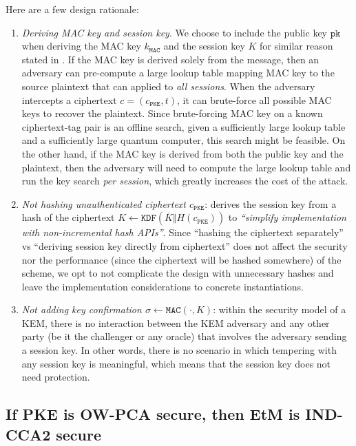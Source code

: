 \documentclass[floatrow,journal=tches,submission]{iacrtrans}
\newcommand{\monospace}{\texttt}
\newcommand{\pke}{\monospace{PKE}}
\newcommand{\mac}{\monospace{MAC}}
\newcommand{\pk}{\monospace{pk}}
\begin{document}
Here are a few design rationale:
\begin{enumerate}
    \item \emph{Deriving MAC key and session key}. We choose to include the public key $\pk$ when deriving the MAC key $k_\mac$ and the session key $K$ for similar reason stated in \cite{bos2018crystals}. If the MAC key is derived solely from the message, then an adversary can pre-compute a large lookup table mapping MAC key to the source plaintext that can applied to \emph{all sessions}. When the adversary intercepts a ciphertext $c = (c_\pke, t)$, it can brute-force all possible MAC keys to recover the plaintext. Since brute-forcing MAC key on a known ciphertext-tag pair is an offline search, given a sufficiently large lookup table and a sufficiently large quantum computer, this search might be feasible. On the other hand, if the MAC key is derived from both the public key and the plaintext, then the adversary will need to compute the large lookup table and run the key search \emph{per session}, which greatly increases the cost of the attack.
    \item \emph{Not hashing unauthenticated ciphertext $c_\pke$}: \cite{avanzi2019crystals}\cite{bos2018crystals} derives the session key from a hash of the ciphertext $K \leftarrow \monospace{KDF}(\overline{K} \Vert H(c_\pke))$ to \emph{``simplify implementation with non-incremental hash APIs''}. Since ``hashing the ciphertext separately'' vs ``deriving session key directly from ciphertext''  does not affect the security nor the performance (since the ciphertext will be hashed somewhere) of the scheme, we opt to not complicate the design with unnecessary hashes and leave the implementation considerations to concrete instantiations.
    \item \emph{Not adding key confirmation $\sigma \leftarrow \mac(\cdot, K)$}: within the security model of a KEM, there is no interaction between the KEM adversary and any other party (be it the challenger or any oracle) that involves the adversary sending a session key. In other words, there is no scenario in which tempering with any session key is meaningful, which means that the session key does not need protection.
\end{enumerate}

\subsection{If PKE is OW-PCA secure, then EtM is IND-CCA2 secure}
\end{document}
